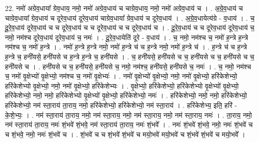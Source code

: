 \documentclass[17pt]{extarticle}
\begin{document}
22. नमो॑ अग्रेव॒धाया᳚ ग्रेव॒धाय॒ नमो॒ नमो॑ अग्रेव॒धाय॑ च चाग्रेव॒धाय॒ नमो॒ नमो॑ अग्रेव॒धाय॑ च । . अ॒ग्रे॒व॒धाय॑ च चाग्रेव॒धाया᳚ ग्रेव॒धाय॑ च दूरेव॒धाय॑ दूरेव॒धाय॑ चाग्रेव॒धाया᳚ ग्रेव॒धाय॑ च दूरेव॒धाय॑ । . अ॒ग्रे॒व॒धायेत्य॑ग्रे - व॒धाय॑ । . च॒ दू॒रे॒व॒धाय॑ दूरेव॒धाय॑ च च दूरेव॒धाय॑ च च दूरेव॒धाय॑ च च दूरेव॒धाय॑ च । . दू॒रे॒व॒धाय॑ च च दूरेव॒धाय॑ दूरेव॒धाय॑ च॒ नमो॒ नम॑श्च दूरेव॒धाय॑ दूरेव॒धाय॑ च॒ नमः॑ । . दू॒रे॒व॒धायेति॑ दूरे - व॒धाय॑ । . च॒ नमो॒ नम॑श्च च॒ नमो॑ ह॒न्त्रे ह॒न्त्रे नम॑श्च च॒ नमो॑ ह॒न्त्रे । . नमो॑ ह॒न्त्रे ह॒न्त्रे नमो॒ नमो॑ ह॒न्त्रे च॑ च ह॒न्त्रे नमो॒ नमो॑ ह॒न्त्रे च॑ । . ह॒न्त्रे च॑ च ह॒न्त्रे ह॒न्त्रे च॒ हनी॑यसे॒ हनी॑यसे च ह॒न्त्रे ह॒न्त्रे च॒ हनी॑यसे । . च॒ हनी॑यसे॒ हनी॑यसे च च॒ हनी॑यसे च च॒ हनी॑यसे च च॒ हनी॑यसे च । . हनी॑यसे च च॒ हनी॑यसे॒ हनी॑यसे च॒ नमो॒ नम॑श्च॒ हनी॑यसे॒ हनी॑यसे च॒ नमः॑ । . च॒ नमो॒ नम॑श्च च॒ नमो॑ वृ॒क्षेभ्यो॑ वृ॒क्षेभ्यो॒ नम॑श्च च॒ नमो॑ वृ॒क्षेभ्यः॑ । . नमो॑ वृ॒क्षेभ्यो॑ वृ॒क्षेभ्यो॒ नमो॒ नमो॑ वृ॒क्षेभ्यो॒ हरि॑केशेभ्यो॒ हरि॑केशेभ्यो वृ॒क्षेभ्यो॒ नमो॒ नमो॑ वृ॒क्षेभ्यो॒ हरि॑केशेभ्यः । . वृ॒क्षेभ्यो॒ हरि॑केशेभ्यो॒ हरि॑केशेभ्यो वृ॒क्षेभ्यो॑ वृ॒क्षेभ्यो॒ हरि॑केशेभ्यो॒ नमो॒ नमो॒ हरि॑केशेभ्यो वृ॒क्षेभ्यो॑ वृ॒क्षेभ्यो॒ हरि॑केशेभ्यो॒ नमः॑ । . हरि॑केशेभ्यो॒ नमो॒ नमो॒ हरि॑केशेभ्यो॒ हरि॑केशेभ्यो॒ नम॑ स्ता॒राय॑ ता॒राय॒ नमो॒ हरि॑केशेभ्यो॒ हरि॑केशेभ्यो॒ नम॑ स्ता॒राय॑ । . हरि॑केशेभ्य॒ इति॒ हरि॑ - के॒शे॒भ्यः॒ । . नम॑ स्ता॒राय॑ ता॒राय॒ नमो॒ नम॑ स्ता॒राय॒ नमो॒ नम॑ स्ता॒राय॒ नमो॒ नम॑ स्ता॒राय॒ नमः॑ । . ता॒राय॒ नमो॒ नम॑ स्ता॒राय॑ ता॒राय॒ नमः॑ शं॒भवे॑ शं॒भवे॒ नम॑ स्ता॒राय॑ ता॒राय॒ नमः॑ शं॒भवे᳚ । . नमः॑ शं॒भवे॑ शं॒भवे॒ नमो॒ नमः॑ शं॒भवे॑ च च शं॒भवे॒ नमो॒ नमः॑ शं॒भवे॑ च । . शं॒भवे॑ च च शं॒भवे॑ शं॒भवे॑ च मयो॒भवे॑ मयो॒भवे॑ च शं॒भवे॑ शं॒भवे॑ च मयो॒भवे᳚ । \newline
\end{document}

